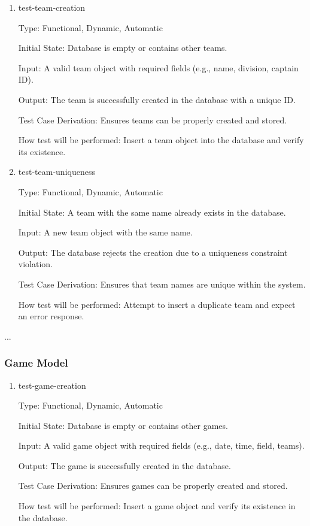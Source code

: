 \documentclass[12pt, titlepage]{article}
\begin{document}
\begin{enumerate}

    \item{test-team-creation\\}

    Type: Functional, Dynamic, Automatic

    Initial State: Database is empty or contains other teams.

    Input: A valid team object with required fields (e.g., name, division, captain ID).

    Output: The team is successfully created in the database with a unique ID.

    Test Case Derivation: Ensures teams can be properly created and stored.

    How test will be performed: Insert a team object into the database and verify its existence.

\item{test-team-uniqueness\\}

    Type: Functional, Dynamic, Automatic

    Initial State: A team with the same name already exists in the database.

    Input: A new team object with the same name.

    Output: The database rejects the creation due to a uniqueness constraint violation.

    Test Case Derivation: Ensures that team names are unique within the system.

    How test will be performed: Attempt to insert a duplicate team and expect an error response.

\end{enumerate}

...\subsubsection{Game Model}

\begin{enumerate}

    \item{test-game-creation\\}

    Type: Functional, Dynamic, Automatic

    Initial State: Database is empty or contains other games.

    Input: A valid game object with required fields (e.g., date, time, field, teams).

    Output: The game is successfully created in the database.

    Test Case Derivation: Ensures games can be properly created and stored.

    How test will be performed: Insert a game object and verify its existence in the database.

\end{enumerate}
\end{document}
